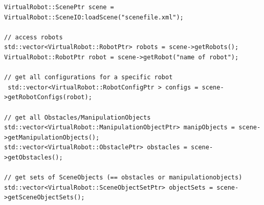 \begin{lstlisting}
VirtualRobot::ScenePtr scene = VirtualRobot::SceneIO:loadScene("scenefile.xml");

// access robots
std::vector<VirtualRobot::RobotPtr> robots = scene->getRobots();
VirtualRobot::RobotPtr robot = scene->getRobot("name of robot");

// get all configurations for a specific robot
 std::vector<VirtualRobot::RobotConfigPtr > configs = scene->getRobotConfigs(robot);

// get all Obstacles/ManipulationObjects
std::vector<VirtualRobot::ManipulationObjectPtr> manipObjects = scene->getManipulationObjects();
std::vector<VirtualRobot::ObstaclePtr> obstacles = scene->getObstacles();

// get sets of SceneObjects (== obstacles or manipulationobjects)
std::vector<VirtualRobot::SceneObjectSetPtr> objectSets = scene->getSceneObjectSets();
\end{lstlisting}
